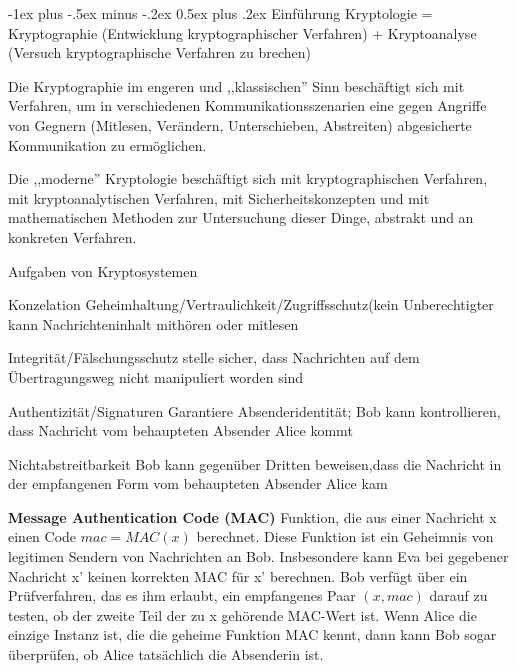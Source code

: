 \documentclass[a4paper]{article}
\makeatletter
\renewcommand{\note}[2]{\begin{noteBox} \textbf{#1} #2 \end{noteBox}}
\renewcommand{\section}{\@startsection{section}{1}{0mm}%
 {-1ex plus -.5ex minus -.2ex}%
 {0.5ex plus .2ex}%
 {\normalfont\large\bfseries}}
\makeatother
\begin{document}
\raggedright
\begin{multicols}{3}\scriptsize
    \setlength{\premulticols}{1pt}
    \setlength{\postmulticols}{1pt}
    \setlength{\multicolsep}{1pt}
    \setlength{\columnsep}{2pt}

    \section{Einführung}
    Kryptologie = Kryptographie (Entwicklung kryptographischer Verfahren) + Kryptoanalyse (Versuch kryptographische Verfahren zu brechen)

    Die Kryptographie im engeren und ,,klassischen'' Sinn beschäftigt sich mit Verfahren, um in verschiedenen Kommunikationsszenarien eine gegen Angriffe von Gegnern  (Mitlesen, Verändern, Unterschieben, Abstreiten)  abgesicherte Kommunikation zu ermöglichen.

    Die ,,moderne'' Kryptologie beschäftigt sich mit kryptographischen Verfahren, mit kryptoanalytischen Verfahren, mit Sicherheitskonzepten und mit mathematischen Methoden zur Untersuchung dieser Dinge, abstrakt und an konkreten Verfahren.

    Aufgaben von Kryptosystemen
    \begin{description*}
        \item[Konzelation] Geheimhaltung/Vertraulichkeit/Zugriffsschutz(kein Unberechtigter kann Nachrichteninhalt mithören oder mitlesen
        \item[Integrität/Fälschungsschutz] stelle sicher, dass Nachrichten auf dem Übertragungsweg nicht manipuliert worden sind
        \item[Authentizität/Signaturen] Garantiere Absenderidentität; Bob kann kontrollieren, dass Nachricht vom behaupteten Absender Alice kommt
        \item[Nichtabstreitbarkeit] Bob kann gegenüber Dritten beweisen,dass die Nachricht in der empfangenen Form vom behaupteten Absender Alice kam
    \end{description*}

    \note{Message Authentication Code (MAC)}{
        Funktion, die aus einer Nachricht x einen Code $mac=MAC(x)$ berechnet. Diese Funktion ist ein Geheimnis von legitimen Sendern von Nachrichten an Bob. Insbesondere kann Eva bei gegebener Nachricht x' keinen korrekten MAC für x' berechnen. Bob verfügt über ein Prüfverfahren, das es ihm erlaubt, ein empfangenes Paar $(x,mac)$ darauf zu testen, ob der zweite Teil der zu x gehörende MAC-Wert ist. Wenn Alice die einzige Instanz ist, die die geheime Funktion MAC kennt, dann kann Bob sogar überprüfen, ob Alice tatsächlich die Absenderin ist.
    }


\end{multicols}
\end{document}
